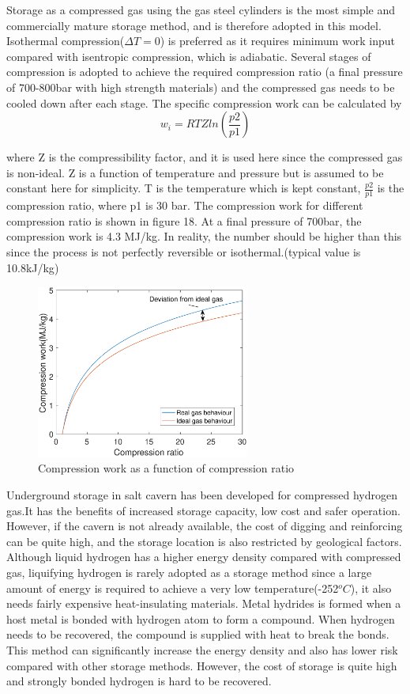 Storage as a compressed gas using the gas steel cylinders is the most simple and commercially mature storage method, and is therefore adopted in this model. Isothermal compression($\Delta T = 0$) is preferred as it requires minimum work input compared with isentropic compression, which is adiabatic. Several stages of compression is adopted to achieve the required compression ratio (a final pressure of 700-800bar with high strength materials) and the compressed gas needs to be cooled down after each stage.  The specific compression work can be calculated by \cite{gas}
\begin{equation}
w_i = RTZln(\frac{p2}{p1})
\end{equation}

where Z is the compressibility factor, and it is used here since the compressed gas is non-ideal. Z  is a function of temperature and pressure but is assumed to be constant here for simplicity. T is the temperature which is kept constant, $\frac{p2}{p1}$ is the compression ratio, where p1 is 30 bar. The compression work for different compression ratio is shown in figure 18. At a final pressure of 700bar, the compression work is 4.3 MJ/kg. In reality, the number should be higher than this since the process is not perfectly reversible or isothermal.(typical value is 10.8kJ/kg\cite{storage})

\begin{figure}[H]
\centering
\includegraphics[width=7cm]{compression.eps}
\caption{Compression work as a function of compression ratio}
\end{figure}

Underground storage in salt cavern has been developed for compressed hydrogen gas.It has the benefits of increased storage capacity, low cost and safer operation. However, if the cavern is not already available, the cost of digging and reinforcing can be quite high, and the storage location is also restricted by geological factors.\cite{cons} Although liquid hydrogen has a higher energy density compared with compressed gas, liquifying hydrogen is rarely adopted as a storage method since a large amount of energy is required to achieve a very low temperature(-252$^oC$), it also needs fairly expensive heat-insulating materials. Metal hydrides is formed when a host metal is bonded with hydrogen atom to form a compound. When hydrogen needs to be recovered, the compound is supplied with heat to break the bonds. This method can significantly increase the energy density and also has lower risk compared with other storage methods. However, the cost of storage is quite high and strongly bonded hydrogen is hard to be recovered.\cite{storage3}


